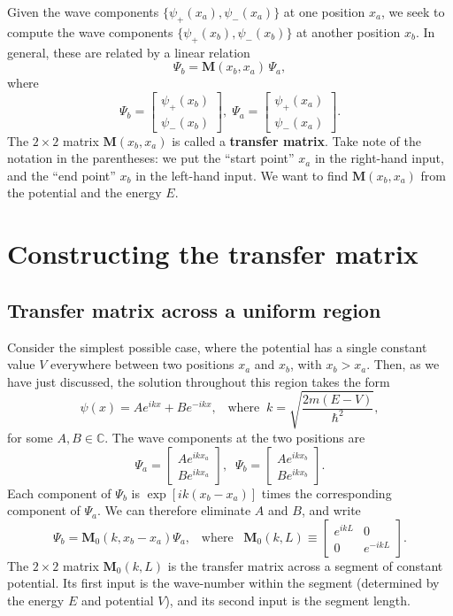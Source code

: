 \documentclass[pra,12pt]{revtex4}
\begin{document}
Given the wave components $\{\psi_+(x_a),\psi_-(x_a)\}$ at one
position $x_a$, we seek to compute the wave components
$\{\psi_+(x_b),\psi_-(x_b)\}$ at another position $x_b$.  In general,
these are related by a linear relation
$$\Psi_b = \mathbf{M}(x_b,x_a) \, \Psi_a,$$
where
$$\Psi_b = \begin{bmatrix}\psi_+(x_b) \\ \psi_-(x_b)\end{bmatrix}, \; \Psi_a = \begin{bmatrix}\psi_+(x_a) \\ \psi_-(x_a)\end{bmatrix}.$$
The $2\times2$ matrix $\mathbf{M}(x_b,x_a)$ is called a
\textbf{transfer matrix}.  Take note of the notation in the
parentheses: we put the ``start point'' $x_a$ in the right-hand input,
and the ``end point'' $x_b$ in the left-hand input.  We want to find
$\mathbf{M}(x_b,x_a)$ from the potential and the energy $E$.

\section{Constructing the transfer matrix}

\subsection{Transfer matrix across a uniform region}

Consider the simplest possible case, where the potential has a single
constant value $V$ everywhere between two positions $x_a$ and $x_b$,
with $x_b > x_a$.  Then, as we have just discussed, the solution
throughout this region takes the form
$$\psi(x) = A e^{ik x} + B e^{-ik x}, \;\;\; \mathrm{where}\;\; k = \sqrt{\frac{2m(E-V)}{\hbar^2}},$$
for some $A, B\in\mathbb{C}$.  The wave components at the two
positions are
$$\Psi_a = \begin{bmatrix} A e^{ik x_a} \\ B e^{ikx_a} \end{bmatrix}, \;\; \Psi_b = \begin{bmatrix} A e^{ik x_b} \\ B e^{ikx_b} \end{bmatrix}.$$
Each component of $\Psi_b$ is $\exp[ik(x_b-x_a)]$ times the
corresponding component of $\Psi_a$.  We can therefore eliminate $A$
and $B$, and write
$$\Psi_b = \mathbf{M}_0(k, x_b-x_a) \Psi_a, \;\;\;\mathrm{where}\;\;\; \mathbf{M}_0(k,L) \equiv \begin{bmatrix}e^{ikL} & 0 \\ 0 & e^{-ikL}\end{bmatrix}.$$
The $2\times2$ matrix $\mathbf{M}_0(k,L)$ is the transfer matrix
across a segment of constant potential.  Its first input is the
wave-number within the segment (determined by the energy $E$ and
potential $V$), and its second input is the segment length.
\end{document}
